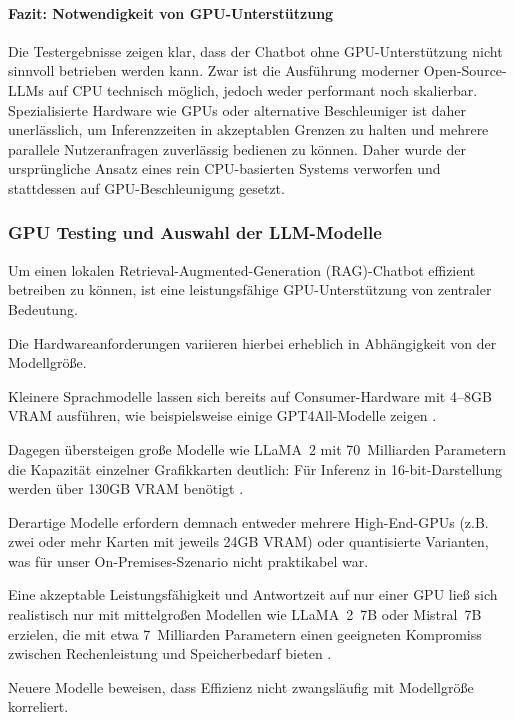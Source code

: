 \paragraph{Fazit: Notwendigkeit von GPU-Unterstützung}

Die Testergebnisse zeigen klar, dass der Chatbot ohne GPU-Unterstützung nicht sinnvoll betrieben werden kann.
Zwar ist die Ausführung moderner Open-Source-LLMs auf CPU technisch möglich, jedoch weder performant noch skalierbar.
Spezialisierte Hardware wie GPUs oder alternative Beschleuniger ist daher unerlässlich, um Inferenzzeiten in akzeptablen Grenzen zu halten und mehrere parallele Nutzeranfragen zuverlässig bedienen zu können.
Daher wurde der ursprüngliche Ansatz eines rein CPU-basierten Systems verworfen und stattdessen auf GPU-Beschleunigung gesetzt.

\subsubsection{GPU Testing und Auswahl der LLM-Modelle}
Um einen lokalen Retrieval-Augmented-Generation (RAG)-Chatbot effizient betreiben zu können, ist eine leistungsfähige GPU-Unterstützung von zentraler Bedeutung.

Die Hardwareanforderungen variieren hierbei erheblich in Abhängigkeit von der Modellgröße.

Kleinere Sprachmodelle lassen sich bereits auf Consumer-Hardware mit 4–8GB VRAM ausführen, wie beispielsweise einige GPT4All-Modelle zeigen \cite{gpt4all_models}.

Dagegen übersteigen große Modelle wie LLaMA~2 mit 70~Milliarden Parametern die Kapazität einzelner Grafikkarten deutlich: Für Inferenz in 16-bit-Darstellung werden über 130GB VRAM benötigt \cite{bacloud_gpu_guide}.

Derartige Modelle erfordern demnach entweder mehrere High-End-GPUs (z.B. zwei oder mehr Karten mit jeweils 24GB VRAM) oder quantisierte Varianten, was für unser On-Premises-Szenario nicht praktikabel war.

Eine akzeptable Leistungsfähigkeit und Antwortzeit auf nur einer GPU ließ sich realistisch nur mit mittelgroßen Modellen wie LLaMA~2~7B oder Mistral~7B erzielen, die mit etwa 7~Milliarden Parametern einen geeigneten Kompromiss zwischen Rechenleistung und Speicherbedarf bieten \cite{bacloud_gpu_guide,obotaiblog}.

Neuere Modelle beweisen, dass Effizienz nicht zwangsläufig mit Modellgröße korreliert.

